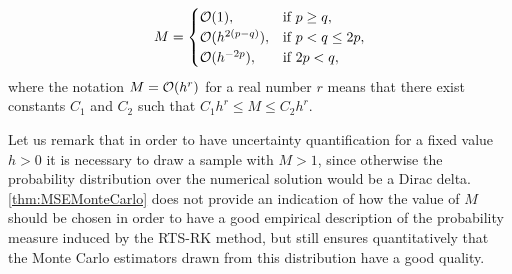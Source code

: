 \documentclass[10pt]{article}
\begin{document}
\begin{equation}
	M = \begin{cases} \mathcal{O}(1), & \mbox{if } p \geq q, \\
	\mathcal{O}(h^{2(p-q)}), & \mbox{if } p < q \leq 2p,\\
	\mathcal{O}(h^{-2p}), & \mbox{if } 2p < q,
	\end{cases}
\end{equation}
where the notation $M=\mathcal{O}(h^r)$ for a real number $r$ means that there exist constants $C_1$ and $C_2$ such that $C_1 h^r \leq M \leq C_2 h^r$.
\begin{remark} Let us remark that in order to have uncertainty quantification for a fixed value $h > 0$ it is necessary to draw a sample with $M > 1$, since otherwise the probability distribution over the numerical solution would be a {Dirac} delta. \cref{thm:MSEMonteCarlo} does not provide an indication of how the value of $M$ should be chosen in order to have a good empirical description of the probability measure induced by the RTS-RK method, but still ensures quantitatively that the Monte Carlo estimators drawn from this distribution have a good quality. 
\end{remark}
\end{document}
